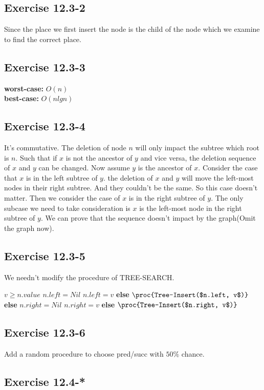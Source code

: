 \documentclass[12pt]{article}
\theoremstyle{definition}
\theoremstyle{remark}
\begin{document}
\subsection*{Exercise 12.3-2}
Since the place we first insert the node is the child of the node which we examine to find the correct place.
\subsection*{Exercise 12.3-3}
\textbf{worst-case:} $O(n)$\\
\textbf{best-case:} $O(nlgn)$
\subsection*{Exercise 12.3-4}
It's commutative. The deletion of node $n$ will only impact the subtree which root is $n$. Such that if $x$ is not the ancestor of $y$ and vice versa, the deletion sequence of $x$ and $y$ can be changed. Now assume $y$ is the ancestor of $x$. Consider the case that $x$ is in the left subtree of $y$. the deletion of $x$ and $y$ will move the left-most nodes in their right subtree. And they couldn't be the same. So this case doesn't matter. Then we consider the case of $x$ is in the right subtree of $y$. The only subcase we need to take consideration is $x$ is the left-most node in the right subtree of $y$. We can prove that the sequence doesn't impact by the graph(Omit the graph now).
\subsection*{Exercise 12.3-5}
We needn't modify the procedure of TREE-SEARCH.
\begin{codebox}
\li \If $v\ge n.value$ \label{li:if}
\li \quad \If $n.left=Nil$ \label{li:if}
\li \qquad $n.left=v$
\li \quad \textbf{else}
\li \qquad $\proc{Tree-Insert($n.left, v$)}$
\li \textbf{else}
\li \quad \If $n.right=Nil$ \label{li:if}
\li \qquad $n.right=v$
\li \quad \textbf{else}
\li \qquad $\proc{Tree-Insert($n.right, v$)}$
\end{codebox}
\subsection*{Exercise 12.3-6}
Add a random procedure to choose pred/succ with $50\%$ chance.
\subsection*{Exercise 12.4-*}
\end{document}
